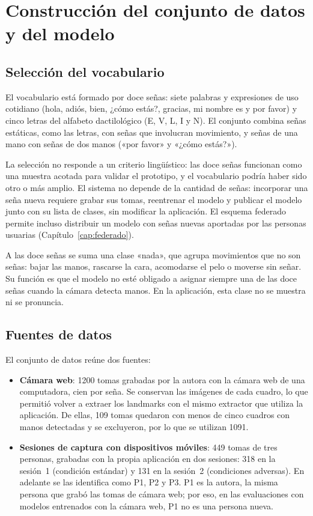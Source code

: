 \chapter{Construcción del conjunto de datos y del modelo}
\label{cap:dataset-modelo}

\section{Selección del vocabulario}

El vocabulario está formado por doce señas: siete palabras y expresiones de uso cotidiano (hola, adiós, bien, ¿cómo estás?, gracias, mi nombre es y por favor) y cinco letras del alfabeto dactilológico (E, V, L, I y N). El conjunto combina señas estáticas, como las letras, con señas que involucran movimiento, y señas de una mano con señas de dos manos («por favor» y «¿cómo estás?»).

La selección no responde a un criterio lingüístico: las doce señas funcionan como una muestra acotada para validar el prototipo, y el vocabulario podría haber sido otro o más amplio. El sistema no depende de la cantidad de señas: incorporar una seña nueva requiere grabar sus tomas, reentrenar el modelo y publicar el modelo junto con su lista de clases, sin modificar la aplicación. El esquema federado permite incluso distribuir un modelo con señas nuevas aportadas por las personas usuarias (Capítulo~\ref{cap:federado}).

A las doce señas se suma una clase «nada», que agrupa movimientos que no son señas: bajar las manos, rascarse la cara, acomodarse el pelo o moverse sin señar. Su función es que el modelo no esté obligado a asignar siempre una de las doce señas cuando la cámara detecta manos. En la aplicación, esta clase no se muestra ni se pronuncia.

\section{Fuentes de datos}

El conjunto de datos reúne dos fuentes:

\begin{itemize}
    \item \textbf{Cámara web}: 1200 tomas grabadas por la autora con la cámara web de una computadora, cien por seña. Se conservan las imágenes de cada cuadro, lo que permitió volver a extraer los landmarks con el mismo extractor que utiliza la aplicación. De ellas, 109 tomas quedaron con menos de cinco cuadros con manos detectadas y se excluyeron, por lo que se utilizan 1091.
    \item \textbf{Sesiones de captura con dispositivos móviles}: 449 tomas de tres personas, grabadas con la propia aplicación en dos sesiones: 318 en la sesión~1 (condición estándar) y 131 en la sesión~2 (condiciones adversas). En adelante se las identifica como P1, P2 y P3. P1 es la autora, la misma persona que grabó las tomas de cámara web; por eso, en las evaluaciones con modelos entrenados con la cámara web, P1 no es una persona nueva.
\end{itemize}

